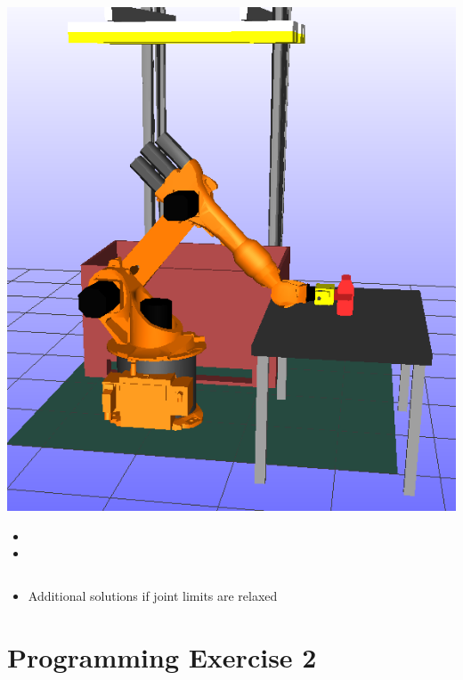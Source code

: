 \documentclass{beamer}
\begin{document}
\begin{frame}
\begin{columns}
\begin{column}{0.5\textwidth}
\begin{center}
        \includegraphics[height=0.5\textheight]{./graphics/ex22sol2}
      \begin{itemize}
      \item {}
      \item {}
      \end{itemize}
      \end{center}
      
    \end{column}
  \end{columns}
\begin{itemize}
\item Additional solutions if joint limits are relaxed
\end{itemize}
\end{frame}



\section{Programming Exercise 2} %
\end{document}
